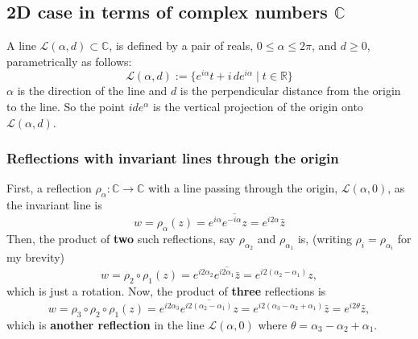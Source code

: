 \documentclass{article}
\begin{document}
\subsection{2D case in terms of complex numbers $\mathbb{C}$}
\label{sec-3-1}
A line $\mathcal{L}(\alpha, d) \subset \mathbb{C}$, is defined by a pair of reals, $0 \le \alpha \le 2\pi$, and $d \ge 0$, parametrically as follows:
\begin{equation}
\mathcal{L}(\alpha, d) := \{ e^{i\alpha}t + i \, d e^{i\alpha} \mid t \in \mathbb{R} \}
\end{equation}
$\alpha$ is the direction of the line and $d$ is the perpendicular distance from the origin to the line. So the point $i d e^{\alpha}$ is the vertical projection of the origin onto $\mathcal{L}(\alpha, d)$.
\subsubsection{Reflections with invariant lines through the origin}
\label{sec-3-1-1}
First, a reflection $\rho_{\alpha}:\mathbb{C} \rightarrow \mathbb{C}$ with a line passing through the origin, $\mathcal{L}(\alpha, 0)$, as the invariant line is
\begin{equation}
w = \rho_{\alpha} (z) = e^{i\alpha} \overline{e^{-i\alpha} z} = e^{i2\alpha} \bar{z}
\end{equation}
Then, the product of \textbf{two} such reflections, say $\rho_{\alpha_{2}}$ and $\rho_{\alpha_{1}}$ is, (writing $\rho_{i} = \rho_{\alpha_{i}}$ for my brevity)
\begin{equation}
w = \rho_{2} \circ \rho_{1} (z) = e^{i2\alpha_{2}} \overline{e^{i2\alpha_{1}} \bar{z}} = e^{i2(\alpha_{2} - \alpha_{1})} z,
\end{equation}
which is just a rotation. Now, the product of \textbf{three} reflections is
\begin{equation}
w = \rho_{3} \circ \rho_{2} \circ \rho_{1} (z) = e^{i2\alpha_{3}} \overline{e^{i2(\alpha_{2} - \alpha_{1})} z} = e^{i2(\alpha_{3} - \alpha_{2} + \alpha_{1})} \bar{z} = e^{i2\theta} \bar{z},
\end{equation}
which is \textbf{another reflection} in the line $\mathcal{L}(\alpha, 0)$ where $\theta = \alpha_{3} - \alpha_{2} + \alpha_{1}$.\\
\end{document}
